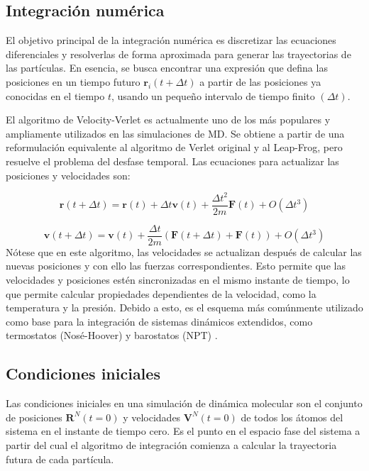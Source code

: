 \subsection{Integración numérica}
El objetivo principal de la integración numérica es discretizar las ecuaciones diferenciales y resolverlas de forma aproximada para generar las trayectorias de las partículas. En esencia, se busca encontrar una expresión que defina las posiciones en un tiempo futuro $\mathbf{r}_i (t +\Delta t)$ a partir de las posiciones ya conocidas en el tiempo $t$, usando un pequeño intervalo de tiempo finito $(\Delta t)$. 

El algoritmo de Velocity-Verlet es actualmente uno de los más populares y ampliamente utilizados en las simulaciones de MD. Se obtiene a partir de una reformulación equivalente al algoritmo de Verlet original y al Leap-Frog, pero resuelve el problema del desfase temporal. Las ecuaciones para actualizar las posiciones y velocidades son:

\begin{equation}
    \label{eq:velocity_verlet_posiciones}
    \mathbf{r}(t + \Delta t) = \mathbf{r}(t) + \Delta t \mathbf{v}(t) + \frac{\Delta t^2}{2m} \mathbf{F}(t) + O(\Delta t^3)
\end{equation}

\begin{equation}
    \label{eq:velocity_verlet_velocidades}
    \mathbf{v}(t + \Delta t) = \mathbf{v}(t) + \frac{\Delta t}{2m} \left( \mathbf{F}(t + \Delta t) + \mathbf{F}(t) \right) + O(\Delta t^3)
\end{equation}
Nótese que en este algoritmo, las velocidades se actualizan después de calcular las nuevas posiciones y con ello las fuerzas correspondientes. Esto permite que las velocidades y posiciones estén sincronizadas en el mismo instante de tiempo, lo que permite calcular propiedades dependientes de la velocidad, como la temperatura y la presión. Debido a esto, es el esquema más comúnmente utilizado como base para la integración de sistemas dinámicos extendidos, como termostatos (Nosé-Hoover) y barostatos (NPT) \cite{Hoover-1992-01,frenkel2002understanding}.


\subsection{Condiciones iniciales}

Las condiciones iniciales en una simulación de dinámica molecular son el conjunto de posiciones $\mathbf{R}^N (t = 0)$ y velocidades $\mathbf{V}^N (t = 0)$ de todos los átomos del sistema en el instante de tiempo cero. Es el punto en el espacio fase del sistema a partir del cual el algoritmo de integración comienza a calcular la trayectoria futura de cada partícula. 

